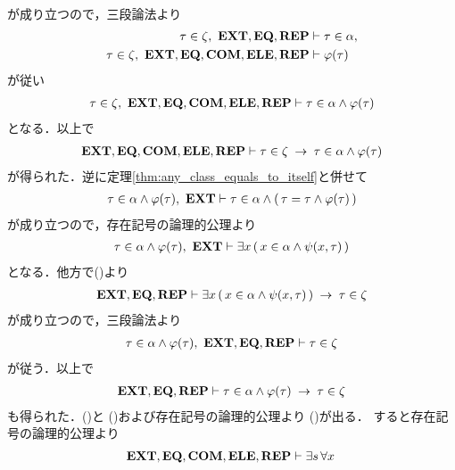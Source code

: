 \begin{sketch}
\begin{description}
\begin{align}
				\end{align}
				が成り立つので，三段論法より
				\begin{align}
					\tau \in \zeta,\ \mbox{{\bf EXT}},\mbox{{\bf EQ}},\mbox{{\bf REP}} &\vdash \tau \in \alpha, \\
					\tau \in \zeta,\ \mbox{{\bf EXT}},\mbox{{\bf EQ}},\mbox{\bf COM},\mbox{{\bf ELE}},\mbox{{\bf REP}} &\vdash \varphi(\tau)
				\end{align}
				が従い
				\begin{align}
					\tau \in \zeta,\ \mbox{{\bf EXT}},\mbox{{\bf EQ}},\mbox{\bf COM},\mbox{{\bf ELE}},\mbox{{\bf REP}} \vdash
					\tau \in \alpha \wedge \varphi(\tau)
				\end{align}
				となる．以上で
				\begin{align}
					\mbox{{\bf EXT}},\mbox{{\bf EQ}},\mbox{\bf COM},\mbox{{\bf ELE}},\mbox{{\bf REP}} \vdash \tau \in \zeta \hspace{0.25em}\rightarrow\hspace{0.25em}
					\tau \in \alpha \wedge \varphi(\tau)
					\label{fom:thm_axiom_of_separation_6}
				\end{align}
				が得られた．逆に定理\ref{thm:any_class_equals_to_itself}と併せて
				\begin{align}
					\tau \in \alpha \wedge \varphi(\tau),\ \mbox{{\bf EXT}} \vdash
					\tau \in \alpha \wedge (\, \tau = \tau \wedge \varphi(\tau)\, )
				\end{align}
				が成り立つので，存在記号の論理的公理より
				\begin{align}
					\tau \in \alpha \wedge \varphi(\tau),\ \mbox{{\bf EXT}} \vdash
					\exists x\, (\, x \in \alpha \wedge \psi(x,\tau)\, )
				\end{align}
				となる．他方で()より
				\begin{align}
					\mbox{{\bf EXT}},\mbox{{\bf EQ}},\mbox{{\bf REP}} \vdash 
					\exists x\, (\, x \in \alpha \wedge 
					\psi(x,\tau)\, ) \hspace{0.25em}\rightarrow\hspace{0.25em} \tau \in \zeta
				\end{align}
				が成り立つので，三段論法より
				\begin{align}
					\tau \in \alpha \wedge \varphi(\tau),\ 
					\EXTAX,\EQAX,\REPAX \vdash \tau \in \zeta
				\end{align}
				が従う．以上で
				\begin{align}
					\mbox{{\bf EXT}},\mbox{{\bf EQ}},\mbox{{\bf REP}} \vdash 
					\tau \in \alpha \wedge \varphi(\tau) \hspace{0.25em}\rightarrow\hspace{0.25em} \tau \in \zeta
					\label{fom:thm_axiom_of_separation_7}
				\end{align}
				も得られた．()と
				()および存在記号の論理的公理より
				()が出る．
				すると存在記号の論理的公理より
				\begin{align}
					\EXTAX,\EQAX,\COMAX,\ELEAX,\REPAX \vdash \exists s\, \forall x\,

\end{align}
\end{description}
\end{sketch}
